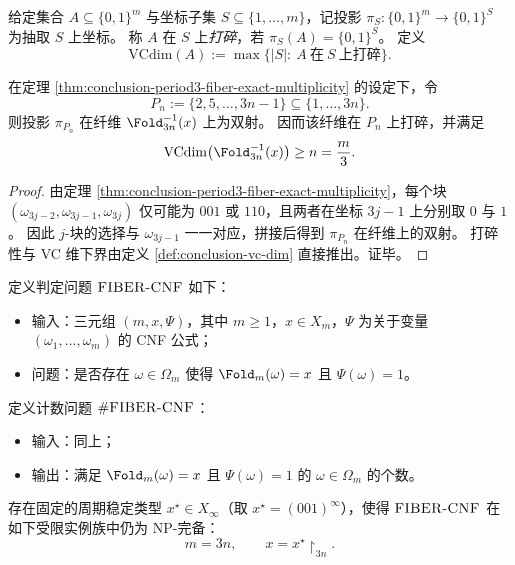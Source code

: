 \begin{definition}[坐标打碎与 VC 维]\label{def:conclusion-vc-dim}
给定集合 \(A\subseteq\{0,1\}^m\) 与坐标子集 \(S\subseteq\{1,\dots,m\}\)，记投影 \(\pi_S:\{0,1\}^m\to\{0,1\}^{S}\) 为抽取 \(S\) 上坐标。
称 \(A\) 在 \(S\) 上\emph{打碎}，若 \(\pi_S(A)=\{0,1\}^{S}\)。
定义
\[
\mathrm{VCdim}(A):=\max\{|S|:\ A\ \text{在}\ S\ \text{上打碎}\}.
\]
\end{definition}

\begin{corollary}\label{cor:conclusion-period3-fiber-hypercube-vc}
在定理 \ref{thm:conclusion-period3-fiber-exact-multiplicity} 的设定下，令
\[
P_n:=\{2,5,\dots,3n-1\}\subseteq\{1,\dots,3n\}.
\]
则投影 \(\pi_{P_n}\) 在纤维 \(\Fold_{3n}^{-1}(x)\) 上为双射。
因而该纤维在 \(P_n\) 上打碎，并满足
\[
\mathrm{VCdim}\bigl(\Fold_{3n}^{-1}(x)\bigr)\ge n=\frac{m}{3}.
\]
\end{corollary}

\begin{proof}
由定理 \ref{thm:conclusion-period3-fiber-exact-multiplicity}，每个块 \((\omega_{3j-2},\omega_{3j-1},\omega_{3j})\) 仅可能为 \(001\) 或 \(110\)，且两者在坐标 \(3j-1\) 上分别取 \(0\) 与 \(1\)。
因此 \(j\)-块的选择与 \(\omega_{3j-1}\) 一一对应，拼接后得到 \(\pi_{P_n}\) 在纤维上的双射。
打碎性与 VC 维下界由定义 \ref{def:conclusion-vc-dim} 直接推出。证毕。
\end{proof}

\begin{definition}[纤维约束可满足性与计数问题]\label{def:conclusion-fiber-cnf}
定义判定问题 \(\textsc{FIBER-CNF}\) 如下：
\begin{itemize}
  \item 输入：三元组 \((m,x,\Psi)\)，其中 \(m\ge 1\)，\(x\in X_m\)，\(\Psi\) 为关于变量 \((\omega_1,\dots,\omega_m)\) 的 CNF 公式；
  \item 问题：是否存在 \(\omega\in\Omega_m\) 使得 \(\Fold_m(\omega)=x\) 且 \(\Psi(\omega)=1\)。
\end{itemize}
定义计数问题 \(\#\textsc{FIBER-CNF}\)：
\begin{itemize}
  \item 输入：同上；
  \item 输出：满足 \(\Fold_m(\omega)=x\) 且 \(\Psi(\omega)=1\) 的 \(\omega\in\Omega_m\) 的个数。
\end{itemize}
\end{definition}

\begin{theorem}\label{thm:conclusion-fiber-cnf-npcomplete-periodic}
存在固定的周期稳定类型 \(x^\star\in X_\infty\)（取 \(x^\star=(001)^\infty\)），使得 \(\text{\normalfont\textsc{FIBER-CNF}}\) 在如下受限实例族中仍为 \(\mathrm{NP}\)-完备：
\[
m=3n,\qquad x=x^\star\!\upharpoonright_{3n}.
\]
\end{theorem}

